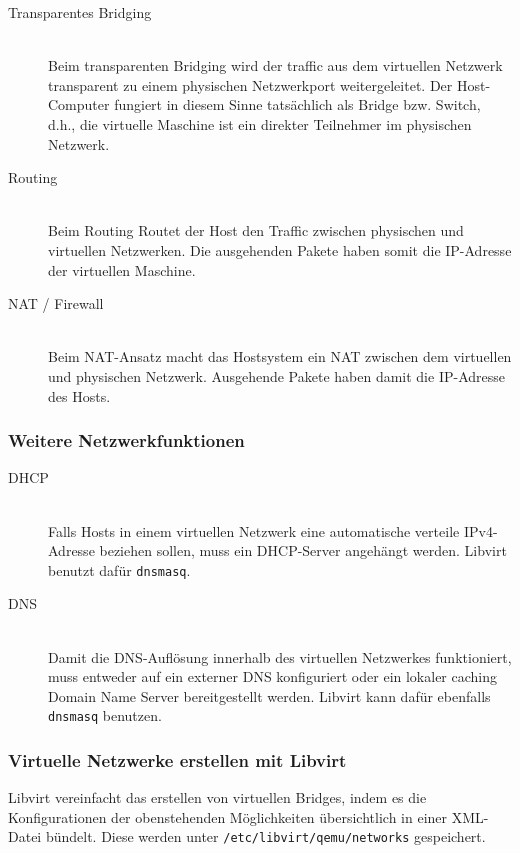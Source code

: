 \begin{description}
	\item[Transparentes Bridging] \hfill \\
		Beim transparenten Bridging wird der traffic aus dem virtuellen Netzwerk transparent zu einem physischen Netzwerkport weitergeleitet. Der Host-Computer fungiert in diesem Sinne tatsächlich als Bridge bzw. Switch, d.h., die virtuelle Maschine ist ein direkter Teilnehmer im physischen Netzwerk.
	\item[Routing] \hfill \\
		Beim Routing Routet der Host den Traffic zwischen physischen und virtuellen Netzwerken. Die ausgehenden Pakete haben somit die IP-Adresse der virtuellen Maschine.
	\item[NAT / Firewall] \hfill \\
		Beim NAT-Ansatz macht das Hostsystem ein NAT zwischen dem virtuellen und physischen Netzwerk. Ausgehende Pakete haben damit die IP-Adresse des Hosts.
\end{description}


\subsubsection{Weitere Netzwerkfunktionen}
\begin{description}
	\item[DHCP] \hfill \\
		Falls Hosts in einem virtuellen Netzwerk eine automatische verteile IPv4-Adresse beziehen sollen, muss ein DHCP-Server angehängt werden. Libvirt benutzt dafür \lstinline|dnsmasq|.
	\item[DNS] \hfill \\
		Damit die DNS-Auflösung innerhalb des virtuellen Netzwerkes funktioniert, muss entweder auf ein externer DNS konfiguriert oder ein lokaler caching Domain Name Server bereitgestellt werden. Libvirt kann dafür ebenfalls \lstinline|dnsmasq| benutzen.
\end{description}

\subsubsection{Virtuelle Netzwerke erstellen mit Libvirt}
Libvirt vereinfacht das erstellen von virtuellen Bridges, indem es die Konfigurationen der obenstehenden Möglichkeiten übersichtlich in einer XML-Datei bündelt. Diese werden unter \lstinline|/etc/libvirt/qemu/networks| gespeichert.

